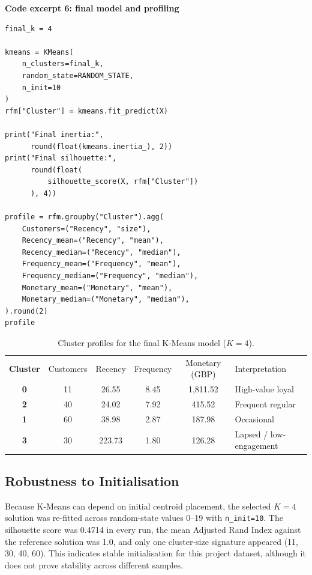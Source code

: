 \documentclass[11pt,a4paper]{article}
\begin{document}
\textbf{Code excerpt 6: final model and profiling}
\begin{lstlisting}[style=pythonshot]
final_k = 4

kmeans = KMeans(
    n_clusters=final_k,
    random_state=RANDOM_STATE,
    n_init=10
)
rfm["Cluster"] = kmeans.fit_predict(X)

print("Final inertia:",
      round(float(kmeans.inertia_), 2))
print("Final silhouette:",
      round(float(
          silhouette_score(X, rfm["Cluster"])
      ), 4))

profile = rfm.groupby("Cluster").agg(
    Customers=("Recency", "size"),
    Recency_mean=("Recency", "mean"),
    Recency_median=("Recency", "median"),
    Frequency_mean=("Frequency", "mean"),
    Frequency_median=("Frequency", "median"),
    Monetary_mean=("Monetary", "mean"),
    Monetary_median=("Monetary", "median"),
).round(2)
profile
\end{lstlisting}

\begin{table}[H]
\centering
\caption{Cluster profiles for the final K-Means model ($K=4$).}\label{tab:profiles}
\small
{}
\begin{tabularx}{\textwidth}{>{\bfseries}c c c c c X}
\rowcolor{bcuBlue}\color{white}Cluster & \color{white}Customers & \color{white}Recency & \color{white}Frequency & \color{white}Monetary (GBP) & \color{white}Interpretation\\
0 & 11 & 26.55 & 8.45 & 1,811.52 & High-value loyal\\
2 & 40 & 24.02 & 7.92 & 415.52 & Frequent regular\\
1 & 60 & 38.98 & 2.87 & 187.98 & Occasional\\
3 & 30 & 223.73 & 1.80 & 126.28 & Lapsed / low-engagement\\
\end{tabularx}
\end{table}
\clearpage

\subsection{Robustness to Initialisation}
Because K-Means can depend on initial centroid placement, the selected $K=4$ solution was re-fitted across random-state values 0--19 with \texttt{n\_init=10}. The silhouette score was 0.4714 in every run, the mean Adjusted Rand Index against the reference solution was 1.0, and only one cluster-size signature appeared (11, 30, 40, 60). This indicates stable initialisation for this project dataset, although it does not prove stability across different samples.
\end{document}
